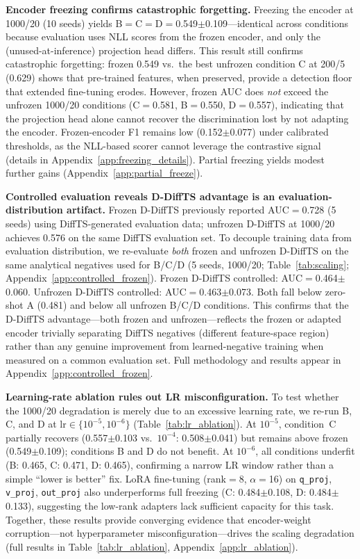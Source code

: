 \textbf{Encoder freezing confirms catastrophic forgetting.}
Freezing the encoder at 1000/20 (10 seeds) yields
B$=$C$=$D$=$0.549$\pm$0.109---identical across conditions because
evaluation uses NLL scores from the frozen encoder, and only the
(unused-at-inference) projection head differs.
This result still confirms catastrophic forgetting: frozen 0.549
vs.\ the best unfrozen condition C at 200/5 (0.629) shows that
pre-trained features, when preserved, provide a detection floor
that extended fine-tuning erodes.
However, frozen AUC does \emph{not} exceed the unfrozen 1000/20
conditions (C$=$0.581, B$=$0.550, D$=$0.557), indicating that
the projection head alone cannot recover the discrimination lost
by not adapting the encoder.
Frozen-encoder F1 remains low (0.152$\pm$0.077) under calibrated
thresholds, as the NLL-based scorer cannot leverage the contrastive
signal (details in Appendix~\ref{app:freezing_details}).
Partial freezing yields modest further gains
(Appendix~\ref{app:partial_freeze}).

\textbf{Controlled evaluation reveals D-DiffTS advantage is an evaluation-distribution artifact.}
Frozen D-DiffTS previously reported AUC$=$0.728 (5 seeds) using
DiffTS-generated evaluation data; unfrozen D-DiffTS at 1000/20 achieves
0.576 on the same DiffTS evaluation set.
To decouple training data from evaluation distribution, we re-evaluate
\emph{both} frozen and unfrozen D-DiffTS on the same analytical negatives
used for B/C/D (5 seeds, 1000/20; Table~\ref{tab:scaling};
Appendix~\ref{app:controlled_frozen}).
Frozen D-DiffTS controlled: AUC$=$0.464$\pm$0.060.
Unfrozen D-DiffTS controlled: AUC$=$0.463$\pm$0.073.
Both fall below zero-shot A (0.481) and below all unfrozen B/C/D conditions.
This confirms that the D-DiffTS advantage---both frozen and unfrozen---reflects
the frozen or adapted encoder trivially separating DiffTS negatives
(different feature-space region) rather than any genuine improvement from
learned-negative training when measured on a common evaluation set.
Full methodology and results appear in Appendix~\ref{app:controlled_frozen}.

\textbf{Learning-rate ablation rules out LR misconfiguration.}
To test whether the 1000/20 degradation is merely due to an excessive learning
rate, we re-run B, C, and D at $\text{lr}{\in}\{10^{-5}, 10^{-6}\}$
(Table~\ref{tab:lr_ablation}).
At $10^{-5}$, condition~C partially recovers
(0.557$\pm$0.103 vs.\ $10^{-4}$: 0.508$\pm$0.041) but remains above frozen
(0.549$\pm$0.109); conditions B and D do not benefit.
At $10^{-6}$, all conditions underfit (B: 0.465, C: 0.471, D: 0.465),
confirming a narrow LR window rather than a simple ``lower is better'' fix.
LoRA fine-tuning (rank$=$8, $\alpha{=}$16) on \texttt{q\_proj}, \texttt{v\_proj},
\texttt{out\_proj} also underperforms full freezing (C: 0.484$\pm$0.108,
D: 0.484$\pm$0.133), suggesting the low-rank adapters lack sufficient capacity
for this task.
Together, these results provide converging evidence that encoder-weight
corruption---not hyperparameter misconfiguration---drives the scaling
degradation (full results in Table~\ref{tab:lr_ablation},
Appendix~\ref{app:lr_ablation}).


